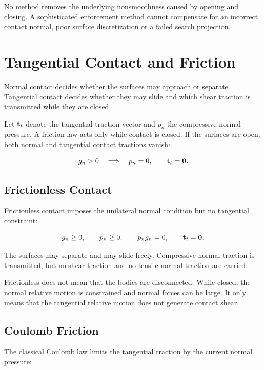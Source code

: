 No method removes the underlying nonsmoothness caused by opening and closing.
A sophisticated enforcement method cannot compensate for an incorrect contact
normal, poor surface discretization or a failed search projection.

\section{Tangential Contact and Friction}

Normal contact decides whether the surfaces may approach or separate.
Tangential contact decides whether they may slide and which shear traction is
transmitted while they are closed.

Let $ \mathbf{t}_t $ denote the tangential traction vector and $ p_n $ the compressive
normal pressure. A friction law acts only while contact is closed. If the
surfaces are open, both normal and tangential contact tractions vanish:

\begin{equation}
    g_n>0 \quad \Longrightarrow \quad p_n=0, \qquad \mathbf{t}_t=\mathbf{0}.
\end{equation}

\subsection{Frictionless Contact}

Frictionless contact imposes the unilateral normal condition but no tangential
constraint:

\begin{equation}\label{contact-frictionless-definition}
    g_n \geq 0, \qquad p_n \geq 0, \qquad p_n g_n=0,
    \qquad \mathbf{t}_t=\mathbf{0}.
\end{equation}

The surfaces may separate and may slide freely. Compressive normal traction is
transmitted, but no shear traction and no tensile normal traction are carried.

Frictionless does not mean that the bodies are disconnected. While closed, the
normal relative motion is constrained and normal forces can be large. It only
means that the tangential relative motion does not generate contact shear.

\subsection{Coulomb Friction}

The classical Coulomb law limits the tangential traction by the current normal
pressure:

